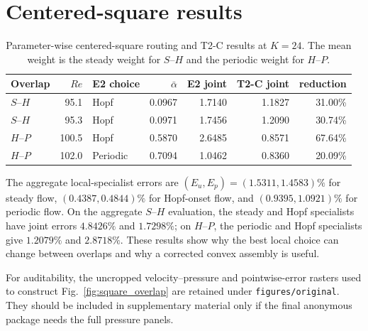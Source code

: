 \section{Centered-square results}
\label{app:square}

\begin{table}[h]
\centering
\caption{Parameter-wise centered-square routing and T2-C results at $K=24$. The mean weight is the steady weight for $S$--$H$ and the periodic weight for $H$--$P$.}
\label{tab:square_parameter}
\small
\setlength{\tabcolsep}{3.5pt}
\begin{tabular}{lrlrrrr}
\toprule
Overlap & $Re$ & E2 choice & $\bar\alpha$ & E2 joint & T2-C joint & reduction \\
\midrule
$S$--$H$ & 95.1 & Hopf & 0.0967 & 1.7140 & 1.1827 & 31.00\% \\
$S$--$H$ & 95.3 & Hopf & 0.0971 & 1.7456 & 1.2090 & 30.74\% \\
$H$--$P$ & 100.5 & Hopf & 0.5870 & 2.6485 & 0.8571 & 67.64\% \\
$H$--$P$ & 102.0 & Periodic & 0.7094 & 1.0462 & 0.8360 & 20.09\% \\
\bottomrule
\end{tabular}
\end{table}

The aggregate local-specialist errors are $(E_u,E_p)=(1.5311,1.4583)\%$ for steady flow, $(0.4387,0.4844)\%$ for Hopf-onset flow, and $(0.9395,1.0921)\%$ for periodic flow. On the aggregate $S$--$H$ evaluation, the steady and Hopf specialists have joint errors $4.8426\%$ and $1.7298\%$; on $H$--$P$, the periodic and Hopf specialists give $1.2079\%$ and $2.8718\%$. These results show why the best local choice can change between overlaps and why a corrected convex assembly is useful.

For auditability, the uncropped velocity--pressure and pointwise-error rasters used to construct Fig.~\ref{fig:square_overlap} are retained under \texttt{figures/original}. They should be included in supplementary material only if the final anonymous package needs the full pressure panels.
